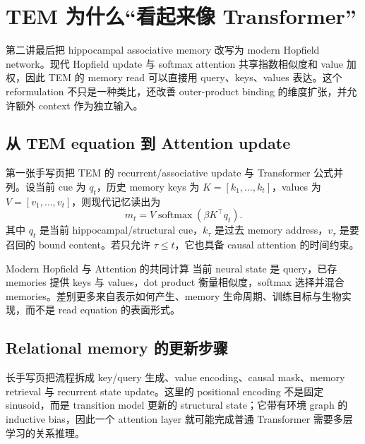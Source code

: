 \section{TEM 为什么“看起来像 Transformer”}

第二讲最后把 hippocampal associative memory 改写为 modern Hopfield network。现代 Hopfield update 与 softmax attention 共享指数相似度和 value 加权，因此 TEM 的 memory read 可以直接用 query、keys、values 表达。这个 reformulation 不只是一种类比，还改善 outer-product binding 的维度扩张，并允许额外 context 作为独立输入。

\subsection{从 TEM equation 到 Attention update}

第一张手写页把 TEM 的 recurrent/associative update 与 Transformer 公式并列。设当前 cue 为 $q_t$，历史 memory keys 为 $K=[k_1,\ldots,k_t]$，values 为 $V=[v_1,\ldots,v_t]$，则现代记忆读出为
$$
m_t=V\operatorname{softmax}(\beta K^{\top}q_t).
$$
其中 $q_t$ 是当前 hippocampal/structural cue，$k_\tau$ 是过去 memory address，$v_\tau$ 是要召回的 bound content。若只允许 $\tau\le t$，它也具备 causal attention 的时间约束。



\begin{importantbox}{Modern Hopfield 与 Attention 的共同计算}
当前 neural state 是 query，已存 memories 提供 keys 与 values，dot product 衡量相似度，softmax 选择并混合 memories。差别更多来自表示如何产生、memory 生命周期、训练目标与生物实现，而不是 read equation 的表面形式。
\end{importantbox}

\subsection{Relational memory 的更新步骤}

长手写页把流程拆成 key/query 生成、value encoding、causal mask、memory retrieval 与 recurrent state update。这里的 positional encoding 不是固定 sinusoid，而是 transition model 更新的 structural state；它带有环境 graph 的 inductive bias，因此一个 attention layer 就可能完成普通 Transformer 需要多层学习的关系推理。

